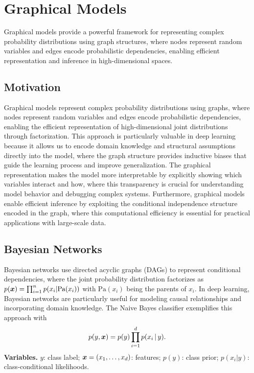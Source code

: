 
\section{Graphical Models }
\label{sec:graphical-models}

Graphical models provide a powerful framework for representing complex probability distributions using graph structures, where nodes represent random variables and edges encode probabilistic dependencies, enabling efficient representation and inference in high-dimensional spaces.

\subsection{Motivation}

Graphical models represent complex probability distributions using graphs, where nodes represent random variables and edges encode probabilistic dependencies, enabling the efficient representation of high-dimensional joint distributions through factorization. This approach is particularly valuable in deep learning because it allows us to encode domain knowledge and structural assumptions directly into the model, where the graph structure provides inductive biases that guide the learning process and improve generalization. The graphical representation makes the model more interpretable by explicitly showing which variables interact and how, where this transparency is crucial for understanding model behavior and debugging complex systems. Furthermore, graphical models enable efficient inference by exploiting the conditional independence structure encoded in the graph, where this computational efficiency is essential for practical applications with large-scale data.

\subsection{Bayesian Networks}

Bayesian networks use directed acyclic graphs (DAGs) to represent conditional dependencies, where the joint probability distribution factorizes as $p(\boldsymbol{x}) = \prod_{i=1}^{n} p(x_i | \text{Pa}(x_i))$ with $\text{Pa}(x_i)$ being the parents of $x_i$. In deep learning, Bayesian networks are particularly useful for modeling causal relationships and incorporating domain knowledge. The Naive Bayes classifier exemplifies this approach with
\begin{equation}
p(y, \boldsymbol{x}) = p(y) \prod_{i=1}^{d} p(x_i\,|\,y).
\end{equation}
\noindent\textbf{Variables.} $y$: class label; $\boldsymbol{x}=(x_1,\dots,x_d)$: features; $p(y)$: class prior; $p(x_i|y)$: class-conditional likelihoods.

